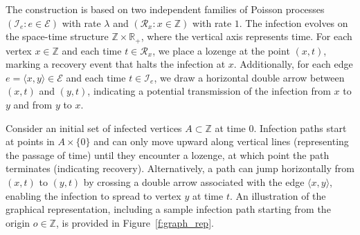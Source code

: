 \documentclass[a4paper,oneside,12pt]{amsart}
\theoremstyle{plain}
\theoremstyle{definition}
\theoremstyle{remark}
\begin{document}
The construction is based on two independent families of Poisson processes $(\mathcal{I}_e \colon e\in \mathcal{E})$ with rate $\lambda$ and $(\mathcal{R}_x \colon x\in \mathbb{Z})$ with rate $1$.
The infection evolves on the space-time structure $\mathbb{Z} \times \mathbb{R}_+$, where the vertical axis represents time. For each vertex $x \in \mathbb{Z}$ and each time $t \in \mathcal{R}_x$, we place a lozenge at the point $(x, t)$, marking a recovery event that halts the infection at $x$. Additionally, for each edge $e = \langle x, y \rangle \in \mathcal{E}$ and each time $t \in \mathcal{I}_e$, we draw a horizontal double arrow between $(x, t)$ and $(y, t)$, indicating a potential transmission of the infection from $x$ to $y$ and from $y$ to $x$.

Consider an initial set of infected vertices $A \subset \mathbb{Z}$ at time 0. 
Infection paths start at points in \( A \times \{0\} \) and can only move upward along vertical lines (representing the passage of time) until they encounter a lozenge, at which point the path terminates (indicating recovery).
Alternatively, a path can jump horizontally from \( (x, t) \) to \( (y, t) \) by crossing a double arrow associated with the edge \( \langle x, y \rangle \), enabling the infection to spread to vertex \( y \) at time \( t \).
An illustration of the graphical representation, including a sample infection path starting from the origin \( o \in \mathbb{Z} \), is provided in Figure~\ref{f:graph_rep}.
\end{document}
